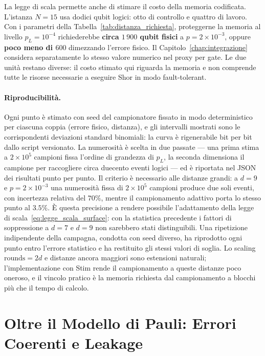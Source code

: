 \begin{onehalfspace}
La legge di scala permette anche di stimare il costo della memoria codificata. L'istanza $N=15$ usa dodici qubit logici: otto di controllo e quattro di lavoro. Con i parametri della Tabella~\ref{tab:distanza_richiesta}, proteggerne la memoria al livello $p_L = 10^{-4}$ richiederebbe \textbf{circa $1\,900$ qubit fisici} a $p = 2\times10^{-3}$, oppure \textbf{poco meno di $600$} dimezzando l'errore fisico. Il Capitolo~\ref{chap:integrazione} considera separatamente lo stesso valore numerico nel proxy per gate. Le due unità restano diverse: il costo stimato qui riguarda la memoria e non comprende tutte le risorse necessarie a eseguire Shor in modo fault-tolerant.

\paragraph{Riproducibilità.}
Ogni punto è stimato con seed del campionatore fissato in modo deterministico per ciascuna coppia (errore fisico, distanza), e gli intervalli mostrati sono le corrispondenti deviazioni standard binomiali: la curva è rigenerabile bit per bit dallo script versionato. La numerosità è scelta in due passate --- una prima stima a $2\times10^{5}$ campioni fissa l'ordine di grandezza di $p_L$, la seconda dimensiona il campione per raccogliere circa duecento eventi logici --- ed è riportata nel JSON dei risultati punto per punto. Il criterio è necessario alle distanze grandi: a $d=9$ e $p = 2\times10^{-3}$ una numerosità fissa di $2\times10^{5}$ campioni produce due soli eventi, con incertezza relativa del $70\%$, mentre il campionamento adattivo porta lo stesso punto al $3.5\%$. È questa precisione a rendere possibile l'adattamento della legge di scala~\eqref{eq:legge_scala_surface}: con la statistica precedente i fattori di soppressione a $d=7$ e $d=9$ non sarebbero stati distinguibili. Una ripetizione indipendente della campagna, condotta con seed diverso, ha riprodotto ogni punto entro l'errore statistico e ha restituito gli stessi valori di soglia. Lo scaling $\text{rounds} = 2d$ e distanze ancora maggiori sono estensioni naturali; l'implementazione con Stim rende il campionamento a queste distanze poco oneroso, e il vincolo pratico è la memoria richiesta dal campionamento a blocchi più che il tempo di calcolo.

\section{Oltre il Modello di Pauli: Errori Coerenti e Leakage}
\label{sec:oltre_pauli}


\end{onehalfspace}
